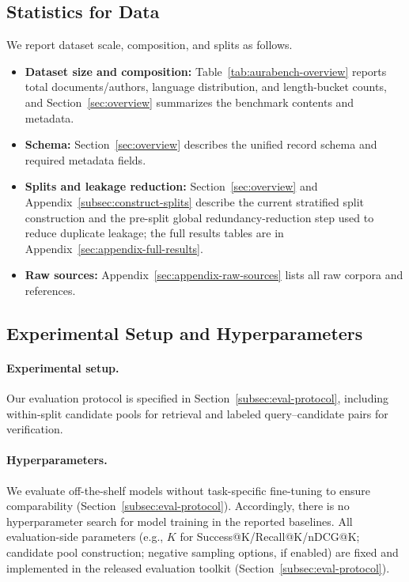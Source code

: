 \documentclass{article}
\begin{document}
\subsection{Statistics for Data}
\label{sec:checklist-b6}
We report dataset scale, composition, and splits as follows.
\begin{itemize}
  \item \textbf{Dataset size and composition:} Table~\ref{tab:aurabench-overview} reports total documents/authors, language distribution, and length-bucket counts, and Section~\ref{sec:overview} summarizes the benchmark contents and metadata.
  \item \textbf{Schema:} Section~\ref{sec:overview} describes the unified record schema and required metadata fields.
  \item \textbf{Splits and leakage reduction:} Section~\ref{sec:overview} and Appendix~\ref{subsec:construct-splits} describe the current stratified split construction and the pre-split global redundancy-reduction step used to reduce duplicate leakage; the full results tables are in Appendix~\ref{sec:appendix-full-results}.
  \item \textbf{Raw sources:} Appendix~\ref{sec:appendix-raw-sources} lists all raw corpora and references.
\end{itemize}


\subsection{Experimental Setup and Hyperparameters}
\label{sec:checklist-c2}
\paragraph{Experimental setup.}
Our evaluation protocol is specified in Section~\ref{subsec:eval-protocol}, including within-split candidate pools for retrieval and labeled query--candidate pairs for verification.

\paragraph{Hyperparameters.}
We evaluate off-the-shelf models without task-specific fine-tuning to ensure comparability (Section~\ref{subsec:eval-protocol}).
Accordingly, there is no hyperparameter search for model training in the reported baselines.
All evaluation-side parameters (e.g., $K$ for Success@K/Recall@K/nDCG@K; candidate pool construction; negative sampling options, if enabled) are fixed and implemented in the released evaluation toolkit (Section~\ref{subsec:eval-protocol}).
\end{document}
